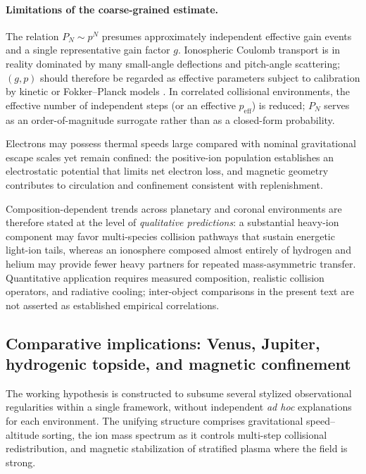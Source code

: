 \documentclass[11pt,a4paper]{article}
\begin{document}
\paragraph{Limitations of the coarse-grained estimate.}
The relation $P_N\sim p^N$ presumes approximately independent effective gain events and a single representative gain factor $g$. Ionospheric Coulomb transport is in reality dominated by many small-angle deflections and pitch-angle scattering; $(g,p)$ should therefore be regarded as effective parameters subject to calibration by kinetic or Fokker--Planck models \cite{ChenPlasmaPhysics1984,Kelley2009EarthIonosphere,SchunkNagy2009IonospherePhysics}. In correlated collisional environments, the effective number of independent steps (or an effective $p_{\mathrm{eff}}$) is reduced; $P_N$ serves as an order-of-magnitude surrogate rather than as a closed-form probability.

Electrons may possess thermal speeds large compared with nominal gravitational escape scales yet remain confined: the positive-ion population establishes an electrostatic potential that limits net electron loss, and magnetic geometry contributes to circulation and confinement consistent with replenishment.

Composition-dependent trends across planetary and coronal environments are therefore stated at the level of \emph{qualitative predictions}: a substantial heavy-ion component may favor multi-species collision pathways that sustain energetic light-ion tails, whereas an ionosphere composed almost entirely of hydrogen and helium may provide fewer heavy partners for repeated mass-asymmetric transfer. Quantitative application requires measured composition, realistic collision operators, and radiative cooling; inter-object comparisons in the present text are not asserted as established empirical correlations.

\subsection{Comparative implications: Venus, Jupiter, hydrogenic topside, and magnetic confinement}
The working hypothesis is constructed to subsume several stylized observational regularities within a single framework, without independent \emph{ad hoc} explanations for each environment. The unifying structure comprises gravitational speed--altitude sorting, the ion mass spectrum as it controls multi-step collisional redistribution, and magnetic stabilization of stratified plasma where the field is strong.
\end{document}
